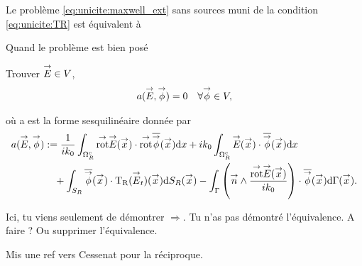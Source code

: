   Le problème \eqref{eq:unicite:maxwell_ext} sans sources muni de la condition \eqref{eq:unicite:TR} est équivalent à
  \begin{REM}
  Quand le problème est bien posé
  \end{REM}
  \begin{prop}
    Trouver \(\vE \in V\),
    \begin{align*}
      a(\vE,\vect\phi) = 0 && \forall \vect \phi \in V,
    \end{align*}

    où a est la forme sesquilinéaire donnée par
    \begin{equation*}
      \begin{aligned}
      a(\vE,\vect\phi) &:=  \frac{1}{ik_0} \int_{\OO^c_R} \trot \vE(\vx) \cdot \trot \conj{\vect{\phi}}(\vx) \dd{x} + ik_0\int_{\OO^c_R}\vE(\vx)\cdot\conj{\vect{\phi}}(\vx) \dd{x}
        \\ 
        & \quad + \int_{S_R} \conj{ \vect \phi }(\vx) \cdot \Tr(\vE_t)(\vx) \dd{S_R}(\vx) - \int_\Gamma \left(\vn \pvect \frac{\trot \vE(\vx)}{ik_0}\right) \cdot \conj{\vect \phi} (\vx) \dd{\Gamma}(\vx).
      \end{aligned}
    \end{equation*}
  \end{prop}
  \begin{REM}
      Ici, tu viens seulement de démontrer \(\Rightarrow\). Tu n'as pas démontré l'équivalence. A faire ? Ou supprimer l'équivalence.
  \end{REM}
  \begin{REP}
    Mis une ref vers Cessenat pour la réciproque.
  \end{REP}
